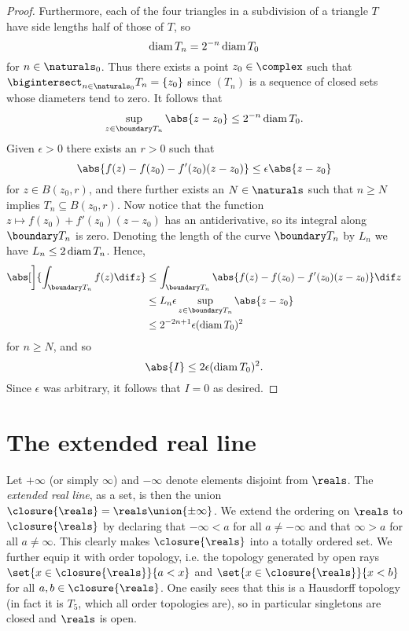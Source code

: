 \documentclass[article, a4paper, 11pt, oneside]{memoir}
\numberwithin{equation}{chapter}
\newcommand{\exreals}{\closure{\reals}}
\begin{document}
\begin{proof}
    Furthermore, each of the four triangles in a subdivision of a triangle $T$ have side lengths half of those of $T$, so
    \begin{equation*}
        \operatorname{diam} T_n
            = 2^{-n} \operatorname{diam} T_0
    \end{equation*}
    for $n \in \naturals_0$. Thus there exists a point $z_0 \in \complex$ such that $\bigintersect_{n\in\naturals_0} T_n = \{ z_0 \}$ since $(T_n)$ is a sequence of closed sets whose diameters tend to zero. It follows that
    \begin{equation*}
        \sup_{z \in \boundary T_n} \abs{z - z_0}
            \leq 2^{-n} \diam T_0.
    \end{equation*}
    Given $\epsilon > 0$ there exists an $r > 0$ such that
    \begin{equation*}
        \abs{ f(z) - f(z_0) - f'(z_0)(z - z_0) }
            \leq \epsilon \abs{z - z_0}
    \end{equation*}
    for $z \in B(z_0,r)$, and there further exists an $N \in \naturals$ such that $n \geq N$ implies $T_n \subseteq B(z_0,r)$. Now notice that the function $z \mapsto f(z_0) + f'(z_0)(z - z_0)$ has an antiderivative, so its integral along $\boundary T_n$ is zero. Denoting the length of the curve $\boundary T_n$ by $L_n$ we have $L_n \leq 2 \operatorname{diam} T_n$. Hence,
    \begin{align*}
        \abs[\bigg]{ \int_{\boundary T_n} f(z) \dif z }
            &\leq \int_{\boundary T_n} \abs{ f(z) - f(z_0) - f'(z_0)(z - z_0) } \dif z \\
            &\leq L_n \epsilon \sup_{z \in \boundary T_n} \abs{z - z_0} \\
            &\leq 2^{-2n+1} \epsilon (\diam T_0)^2
    \end{align*}
    for $n \geq N$, and so
    \begin{equation*}
        \abs{I}
            \leq 2 \epsilon (\diam T_0)^2.
    \end{equation*}
    Since $\epsilon$ was arbitrary, it follows that $I = 0$ as desired.
\end{proof}


\chapter{The extended real line}

Let $+\infty$ (or simply $\infty$) and $-\infty$ denote elements disjoint from $\reals$. The \emph{extended real line}, as a set, is then the union $\exreals = \reals \union \{\pm\infty\}$. We extend the ordering on $\reals$ to $\exreals$ by declaring that $-\infty < a$ for all $a \neq -\infty$ and that $\infty > a$ for all $a \neq \infty$. This clearly makes $\exreals$ into a totally ordered set. We further equip it with order topology, i.e. the topology generated by open rays $\set{x \in \exreals}{a < x}$ and $\set{x \in \exreals}{x < b}$ for all $a,b \in \exreals$. One easily sees that this is a Hausdorff topology (in fact it is $T_5$, which all order topologies are), so in particular singletons are closed and $\reals$ is open.
\end{document}
